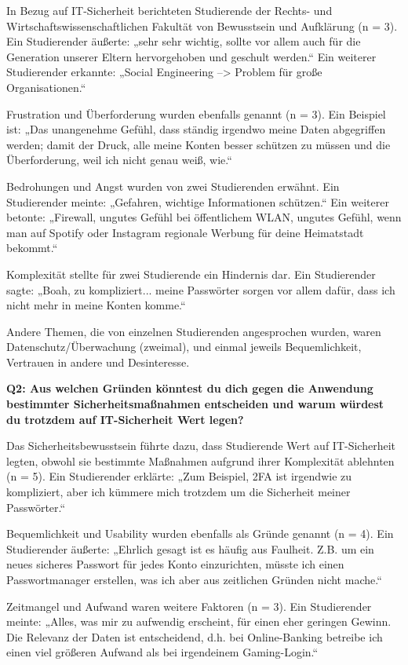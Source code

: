 \documentclass[german,report]{i1thesis}
\begin{document}
In Bezug auf IT-Sicherheit berichteten Studierende der Rechts- und Wirtschaftswissenschaftlichen Fakultät von Bewusstsein und Aufklärung (n = 3). Ein Studierender äußerte: „sehr sehr wichtig, sollte vor allem auch für die Generation unserer Eltern hervorgehoben und geschult werden.“ Ein weiterer Studierender erkannte: „Social Engineering --> Problem für große Organisationen.“

Frustration und Überforderung wurden ebenfalls genannt (n = 3). Ein Beispiel ist: „Das unangenehme Gefühl, dass ständig irgendwo meine Daten abgegriffen werden; damit der Druck, alle meine Konten besser schützen zu müssen und die Überforderung, weil ich nicht genau weiß, wie.“

Bedrohungen und Angst wurden von zwei Studierenden erwähnt. Ein Studierender meinte: „Gefahren, wichtige Informationen schützen.“ Ein weiterer betonte: „Firewall, ungutes Gefühl bei öffentlichem WLAN, ungutes Gefühl, wenn man auf Spotify oder Instagram regionale Werbung für deine Heimatstadt bekommt.“

Komplexität stellte für zwei Studierende ein Hindernis dar. Ein Studierender sagte: „Boah, zu kompliziert... meine Passwörter sorgen vor allem dafür, dass ich nicht mehr in meine Konten komme.“

Andere Themen, die von einzelnen Studierenden angesprochen wurden, waren Datenschutz/Überwachung (zweimal), und einmal jeweils Bequemlichkeit, Vertrauen in andere und Desinteresse.

\textbf{Q2: Aus welchen Gründen könntest du dich gegen die Anwendung bestimmter Sicherheitsmaßnahmen entscheiden und warum würdest du trotzdem auf IT-Sicherheit Wert legen?}

Das Sicherheitsbewusstsein führte dazu, dass Studierende Wert auf IT-Sicherheit legten, obwohl sie bestimmte Maßnahmen aufgrund ihrer Komplexität ablehnten (n = 5). Ein Studierender erklärte: „Zum Beispiel, 2FA ist irgendwie zu kompliziert, aber ich kümmere mich trotzdem um die Sicherheit meiner Passwörter.“

Bequemlichkeit und Usability wurden ebenfalls als Gründe genannt (n = 4). Ein Studierender äußerte: „Ehrlich gesagt ist es häufig aus Faulheit. Z.B. um ein neues sicheres Passwort für jedes Konto einzurichten, müsste ich einen Passwortmanager erstellen, was ich aber aus zeitlichen Gründen nicht mache.“

Zeitmangel und Aufwand waren weitere Faktoren (n = 3). Ein Studierender meinte: „Alles, was mir zu aufwendig erscheint, für einen eher geringen Gewinn. Die Relevanz der Daten ist entscheidend, d.h. bei Online-Banking betreibe ich einen viel größeren Aufwand als bei irgendeinem Gaming-Login.“
\end{document}
